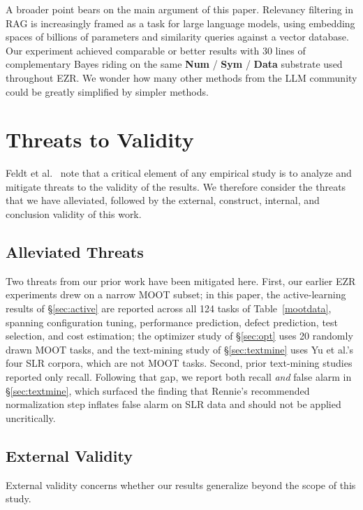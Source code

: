 \documentclass[AMA,STIX2COL]{WileyNJDv5}
\newcommand{\NEW}[1]{\textcolor{newblue}{#1}}
\newcommand{\IT}{{\sffamily EZR}}
\newcommand{\cls}[1]{%
  \setlength{\fboxsep}{1.5pt}%
  \colorbox{clsbg}{\sffamily\bfseries{#1}}%
}
\begin{document}
A broader point bears on the main argument of this paper.
Relevancy filtering in RAG is increasingly framed as a task for large
language models, using embedding spaces of billions of
parameters and similarity queries against a vector database.
Our experiment achieved comparable or better results with 30
lines of complementary Bayes riding on the same
\cls{Num}/\cls{Sym}/\cls{Data} substrate used throughout
EZR. We wonder how many other methods from the LLM community could be greatly simplified by simpler methods.




\section{Threats to Validity}\label{sec:ttv}
Feldt et al.~\cite{feldt2010validity} note that a critical
element of any empirical study is to analyze and mitigate
threats to the validity of the results. We therefore consider
the threats that we have alleviated, followed by the external,
construct, internal, and conclusion validity of this work.

\subsection{Alleviated Threats}
Two threats from our prior work have been mitigated here.
First, our earlier \IT{} experiments drew on a narrow MOOT
subset; in this paper, \NEW{the active-learning results of
\S\ref{sec:active} are} reported across all 124
tasks of Table~\ref{mootdata}, spanning configuration tuning,
performance prediction, defect prediction, test selection, and
cost estimation\NEW{; the optimizer study of \S\ref{sec:opt}
uses 20 randomly drawn MOOT tasks, and the text-mining study of
\S\ref{sec:textmine} uses Yu et al.'s four SLR corpora, which
are not MOOT tasks}. Second, prior text-mining
studies~\cite{yu2018total} reported only recall. Following
that gap, we report both recall {\em and} false alarm in
\S\ref{sec:textmine}, which surfaced the finding that
Rennie's recommended normalization step
\cite{rennie2003tackling} inflates false alarm on SLR data
and should not be applied uncritically.

\subsection{External Validity}
External validity concerns whether our results generalize
beyond the scope of this study.
\end{document}
